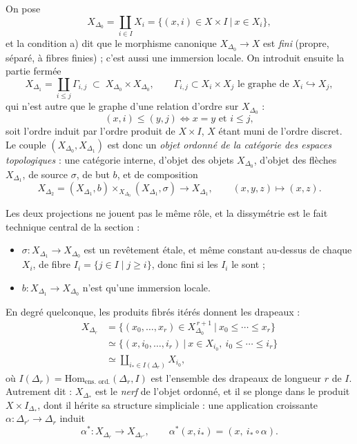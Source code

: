 \documentclass[11pt,a4paper]{article}
\begin{document}
On pose
\[
  X_{\Delta_{0}} = \coprod_{i \in I} X_{i}
  = \bigl\{ (x,i) \in X \times I \ \big|\ x \in X_{i} \bigr\},
\]
et la condition a) dit que le morphisme canonique
$X_{\Delta_{0}} \to X$ est \emph{fini} (propre, séparé, à fibres finies) ; c'est
aussi une immersion locale. On introduit ensuite la partie fermée
\[
  X_{\Delta_{1}} = \coprod_{i \leq j} \Gamma_{i,j}
  \;\subset\; X_{\Delta_{0}} \times X_{\Delta_{0}},
  \qquad \Gamma_{i,j} \subset X_{i} \times X_{j}
  \text{ le graphe de } X_{i} \hookrightarrow X_{j},
\]
qui n'est autre que le graphe d'une relation d'ordre sur $X_{\Delta_{0}}$ :
\[
  (x,i) \leq (y,j) \iff x = y \text{ et } i \leq j,
\]
soit l'ordre induit par l'ordre produit de $X \times I$, $X$ étant muni de
l'ordre discret. Le couple $(X_{\Delta_{0}}, X_{\Delta_{1}})$ est donc un
\emph{objet ordonné de la catégorie des espaces topologiques} : une catégorie
interne, d'objet des objets $X_{\Delta_{0}}$, d'objet des flèches
$X_{\Delta_{1}}$, de source $\sigma$, de but $b$, et de composition
\[
  X_{\Delta_{2}} = (X_{\Delta_{1}},b) \times_{X_{\Delta_{0}}}
  (X_{\Delta_{1}},\sigma) \longrightarrow X_{\Delta_{1}},
  \qquad (x,y,z) \mapsto (x,z).
\]

Les deux projections ne jouent pas le même rôle, et la dissymétrie est le fait
technique central de la section :

\begin{itemize}
\item $\sigma \colon X_{\Delta_{1}} \to X_{\Delta_{0}}$ est un revêtement étale,
et même constant au-dessus de chaque $X_{i}$, de fibre
$I_{i} = \{ j \in I \mid j \geq i \}$, donc fini si les $I_{i}$ le sont ;
\item $b \colon X_{\Delta_{1}} \to X_{\Delta_{0}}$ n'est qu'une immersion locale.
\end{itemize}

En degré quelconque, les produits fibrés itérés donnent les drapeaux :
\[
  \begin{aligned}
    X_{\Delta_{r}}
      &= \bigl\{ (x_{0},\ldots,x_{r}) \in X_{\Delta_{0}}^{\,r+1}
        \ \big|\ x_{0} \leq \cdots \leq x_{r} \bigr\} \\
      &\simeq \bigl\{ (x, i_{0},\ldots,i_{r}) \ \big|\
        x \in X_{i_{0}},\ i_{0} \leq \cdots \leq i_{r} \bigr\} \\
      &\simeq \coprod_{i_{*} \in I(\Delta_{r})} X_{i_{0}},
  \end{aligned}
\]
où $I(\Delta_{r}) = \mathrm{Hom}_{\text{ens. ord.}}(\Delta_{r}, I)$ est
l'ensemble des drapeaux de longueur $r$ de $I$. Autrement dit :
$X_{\Delta_{*}}$ est le \emph{nerf} de l'objet ordonné, et il se plonge dans le
produit $X \times I_{\Delta_{*}}$, dont il hérite sa structure simpliciale :
une application croissante $\alpha \colon \Delta_{r'} \to \Delta_{r}$ induit
\[
  \alpha^{*} \colon X_{\Delta_{r}} \longrightarrow X_{\Delta_{r'}},
  \qquad \alpha^{*}(x,i_{*}) = (x,\ i_{*} \circ \alpha).
\]
\end{document}
